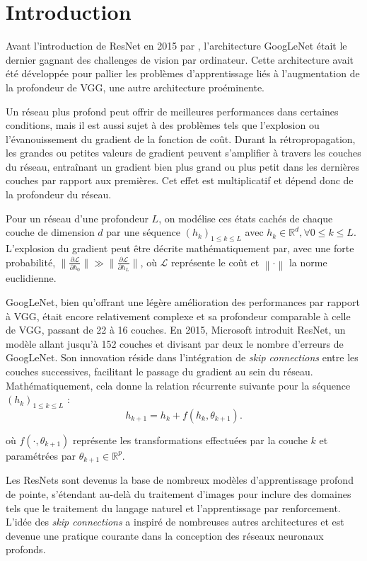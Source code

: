 \chapter{Introduction}
Avant l'introduction de ResNet en 2015 par \citeauthor{resnet}, l'architecture GoogLeNet était le dernier gagnant des challenges de vision par ordinateur. Cette architecture avait été développée pour pallier les problèmes d'apprentissage liés à l'augmentation de la profondeur de VGG, une autre architecture proéminente.

Un réseau plus profond peut offrir de meilleures performances dans certaines conditions, mais il est aussi sujet à des problèmes tels que l'explosion ou l'évanouissement du gradient de la fonction de coût. Durant la rétropropagation, les grandes ou petites valeurs de gradient peuvent s'amplifier à travers les couches du réseau, entraînant un gradient bien plus grand ou plus petit dans les dernières couches par rapport aux premières. Cet effet est multiplicatif et dépend donc de la profondeur du réseau.

Pour un réseau d'une profondeur $L$, on modélise ces états cachés de chaque couche de dimension $d$ par une séquence $(h_k)_{1 \leq k \leq L}$ avec $h_k \in \mathbb{R}^d, \forall 0 \leq k \leq L$. L'explosion du gradient peut être décrite mathématiquement par, avec une forte probabilité, $\| \frac{\partial \mathscr{L}}{\partial h_0} \| \gg \| \frac{\partial \mathscr{L}}{\partial h_L} \|$, où $\mathscr{L}$ représente le coût et $\left\| \cdot \right\|$ la norme euclidienne.

GoogLeNet, bien qu'offrant une légère amélioration des performances par rapport à VGG, était encore relativement complexe et sa profondeur comparable à celle de VGG, passant de 22 à 16 couches. En 2015, Microsoft introduit ResNet, un modèle allant jusqu'à 152 couches et divisant par deux le nombre d'erreurs de GoogLeNet. Son innovation réside dans l'intégration de \textit{skip connections} entre les couches successives, facilitant le passage du gradient au sein du réseau. Mathématiquement, cela donne la relation récurrente suivante pour la séquence $(h_k)_{1 \leq k \leq L}$ :
\[
    h_{k+1} = h_k + f(h_k, \theta_{k+1})
.\]

où $f(\cdot, \theta_{k+1})$ représente les transformations effectuées par la couche $k$ et paramétrées par $\theta_{k+1} \in \mathbb{R}^p$.

Les ResNets sont devenus la base de nombreux modèles d'apprentissage profond de pointe, s'étendant au-delà du traitement d'images pour inclure des domaines tels que le traitement du langage naturel et l'apprentissage par renforcement. L'idée des \textit{skip connections} a inspiré de nombreuses autres architectures et est devenue une pratique courante dans la conception des réseaux neuronaux profonds.

